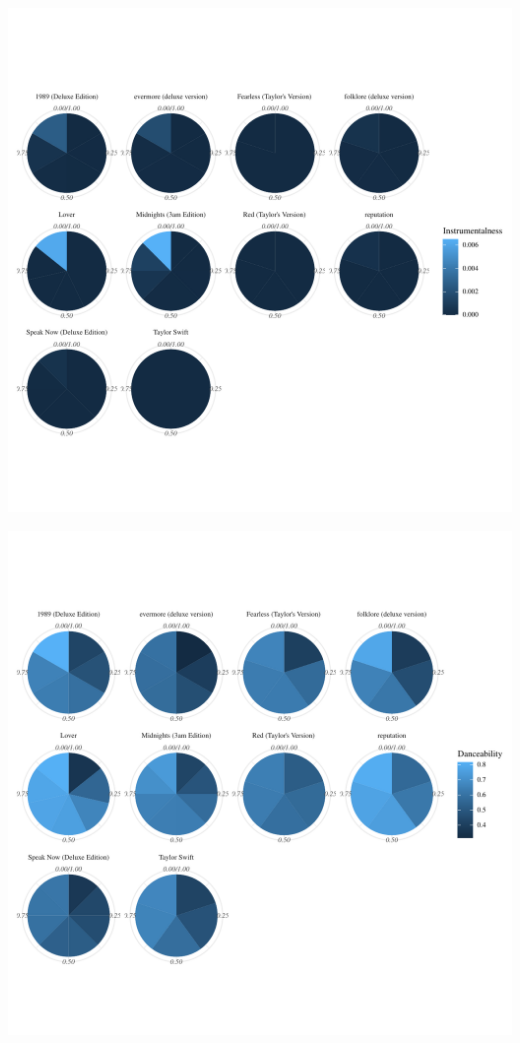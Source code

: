 \documentclass[11pt,preprint, authoryear]{elsarticle}
\let\origfigure\figure
\let\endorigfigure\endfigure
\renewenvironment{figure}[1][2] {
    \expandafter\origfigure\expandafter[H]
} {
    \endorigfigure
}
\numberwithin{equation}{section}
\numberwithin{figure}{section}
\numberwithin{table}{section}
\begin{document}
\begin{figure}[H]

{\centering \includegraphics[angle=90]{Taylor-Swift-Report_files/figure-latex/Figure3-1} 

}

\caption{Common Characteristics of Top 5 Songs Concentration \label{Figure3}}\label{fig:Figure3-1}
\end{figure}
\begin{figure}[H]

{\centering \includegraphics[angle=90]{Taylor-Swift-Report_files/figure-latex/Figure3-2} 

}

\caption{Common Characteristics of Top 5 Songs Concentration \label{Figure3}}\label{fig:Figure3-2}
\end{figure}
\end{document}
